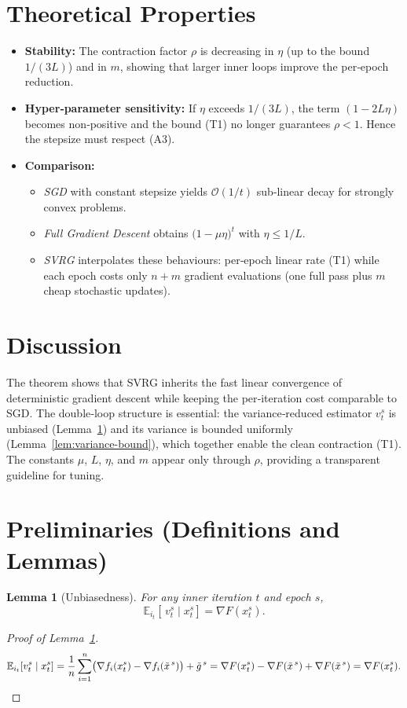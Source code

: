 \documentclass{article}
\newtheorem{lemma}{Lemma}
\newcommand{\E}{\mathbb{E}}
\begin{document}
\section*{Theoretical Properties}
\begin{itemize}
\item \textbf{Stability:} The contraction factor $\rho$ is decreasing in $\eta$ (up to the bound $1/(3L)$) and in $m$, showing that larger inner loops improve the per‑epoch reduction.
\item \textbf{Hyper‑parameter sensitivity:} If $\eta$ exceeds $1/(3L)$, the term $(1-2L\eta)$ becomes non‑positive and the bound (T1) no longer guarantees $\rho<1$. Hence the stepsize must respect (A3).
\item \textbf{Comparison:}
    \begin{itemize}
    \item \emph{SGD} with constant stepsize yields $\mathcal{O}(1/t)$ sub‑linear decay for strongly convex problems.
    \item \emph{Full Gradient Descent} obtains $\bigl(1-\mu\eta\bigr)^{t}$ with $\eta\le 1/L$.
    \item \emph{SVRG} interpolates these behaviours: per‑epoch linear rate (T1) while each epoch costs only $n+m$ gradient evaluations (one full pass plus $m$ cheap stochastic updates).
    \end{itemize}
\end{itemize}

\section*{Discussion}
The theorem shows that SVRG inherits the fast linear convergence of deterministic gradient descent while keeping the per‑iteration cost comparable to SGD. The double‑loop structure is essential: the variance‑reduced estimator $v_t^{s}$ is unbiased (Lemma~\ref{lem:unbiased}) and its variance is bounded uniformly (Lemma~\ref{lem:variance-bound}), which together enable the clean contraction (T1). The constants $\mu$, $L$, $\eta$, and $m$ appear only through $\rho$, providing a transparent guideline for tuning.

\section*{Preliminaries (Definitions and Lemmas)}
\begin{lemma}[Unbiasedness]\label{lem:unbiased}
For any inner iteration $t$ and epoch $s$,
\[
\E_{i_t}\!\left[\,v_t^{s}\mid x_{t}^{s}\right]=\nabla F\!\left(x_{t}^{s}\right).
\]
\end{lemma}
\begin{proof}[Proof of Lemma~\ref{lem:unbiased}]
\[
\E_{i_t}\!\left[v_t^{s}\mid x_{t}^{s}\right]
= \frac{1}{n}\sum_{i=1}^{n}\bigl(\nabla f_i(x_{t}^{s})-\nabla f_i(\tilde{x}^{\,s})\bigr)+\tilde{g}^{\,s}
= \nabla F(x_{t}^{s})-\nabla F(\tilde{x}^{\,s})+\nabla F(\tilde{x}^{\,s})
= \nabla F(x_{t}^{s}).\qedhere
\]
\end{proof}
\end{document}
